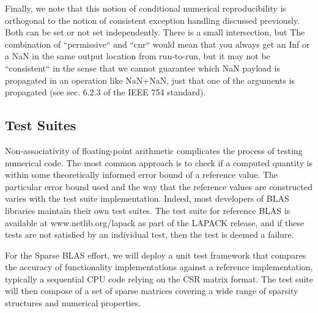 \documentclass{article}
\begin{document}


\fi

Finally, we note that this notion of conditional numerical reproducibility is  orthogonal to the notion of consistent exception handling discussed previously. Both can be set or not set independently. There is a small intersection, but   The combination of ``permissive`` and ``cnr`` would mean that you always get an Inf or a NaN in the same output location from run-to-run, but it may not be ``consistent`` in the sense that we cannot guarantee which NaN payload is propagated in an operation like NaN+NaN, just that one of the arguments is propagated (see sec. 6.2.3 of the IEEE 754 standard).

\subsection{Test Suites}
Non-associativity of floating-point arithmetic complicates the process of testing numerical code.
The most common approach is to check if a computed quantity is within some theoretically informed error bound of a reference value.
The particular error bound used and the way that the reference values are constructed varies with the test suite implementation.
Indeed, most developers of BLAS libraries maintain their own test suites.
The test suite for reference BLAS is available at www.netlib.org/lapack as part 
of the LAPACK release,
and if these tests are not satisfied by an individual test, then the test is deemed 
a failure.

For the Sparse BLAS effort, we will deploy a unit test framework that compares the accuracy of functionality implementations against a reference implementation, typically a sequential CPU code relying on the CSR matrix format. The test suite will then compose of a set of sparse matrices covering a wide range of sparsity structures and numerical properties.
\end{document}
